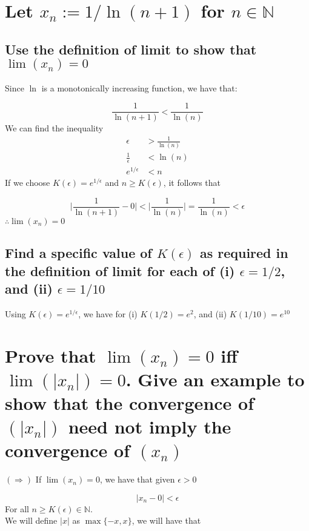 \documentclass{article}
\begin{document}
\section{Let $x_n := 1/\ln(n + 1)$ for $n \in \mathbb{N}$}
\subsection{Use the definition of limit to show that $\lim(x_n) = 0$}
Since $\ln$ is a monotonically increasing function, we have that:

\begin{equation*}
    \frac{1}{\ln(n + 1)} < \frac{1}{\ln(n)}
\end{equation*}
We can find the inequality 
\begin{align*}
    \epsilon & > \frac{1}{\ln(n)} \\
    \frac{1}{\epsilon} & < \ln(n) \\
    e^{1/\epsilon} & < n 
\end{align*}
If we choose $K(\epsilon) = e^{1/\epsilon}$ and $n \ge K(\epsilon)$, it follows that 

\begin{equation*}
    \Big| \frac{1}{\ln(n + 1)} - 0 \Big| < \Big| \frac{1}{\ln(n)} \Big| = \frac{1}{\ln(n)} < \epsilon
\end{equation*}
$\therefore \lim(x_n) = 0$

\subsection{Find a specific value of $K(\epsilon)$ as required in the definition of limit for each of (i) $\epsilon = 1/2$, and (ii) $\epsilon = 1/10$}
Using $K(\epsilon) = e^{1/\epsilon}$, we have for (i) $K(1/2) = e^2$, and (ii) $K(1/10) = e^{10}$

\section{Prove that $\lim(x_n) = 0$ iff $\lim(|x_n|) = 0$. Give an example to show that the convergence of $(|x_n|)$ need not imply the convergence of $(x_n)$}

$(\Longrightarrow)$ If $\lim(x_n) = 0$, we have that given $\epsilon > 0$ 

\begin{equation*}
    |x_n - 0| < \epsilon 
\end{equation*}
For all $n \ge K(\epsilon) \in \mathbb{N}$.
\\
We will define $|x|$ as $\max\{-x, x\}$, we will have that
\end{document}
